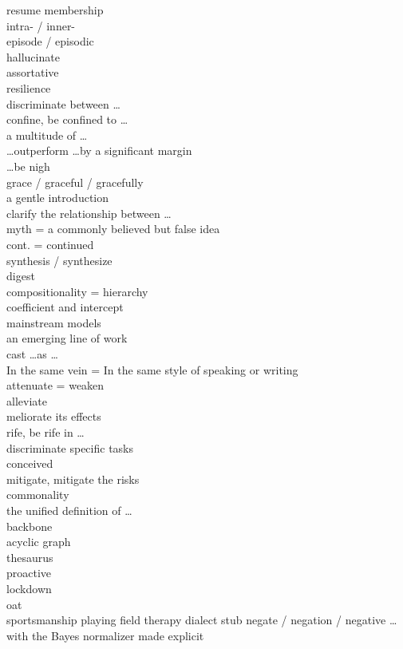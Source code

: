 \documentclass[12pt]{article}
\begin{document}
resume membership \\
intra- / inner- \\
episode / episodic \\
hallucinate \\
assortative \\
resilience \\
discriminate between \dots \\
confine, be confined to \dots \\
a multitude of \dots \\
\dots outperform \dots by a significant margin \\
\dots be nigh \\
grace / graceful / gracefully \\
a gentle introduction \\
clarify the relationship between \dots \\
myth = a commonly believed but false idea \\
cont. = continued \\
synthesis / synthesize \\
digest \\
compositionality = hierarchy \\
coefficient and intercept \\
mainstream models \\
an emerging line of work \\
cast \dots as \dots \\
In the same vein  = In the same style of speaking or writing \\
attenuate = weaken \\
alleviate \\
meliorate its effects \\
rife, be rife in \dots \\
discriminate specific tasks\\
conceived \\
mitigate, mitigate the risks \\
commonality \\
the unified definition of \dots \\
backbone \\
acyclic graph \\
thesaurus\\
proactive \\
lockdown \\
oat \\
sportsmanship 
playing field 
therapy 
dialect 
stub 
negate / negation / negative 
\dots with the Bayes normalizer made explicit 
\end{document}
